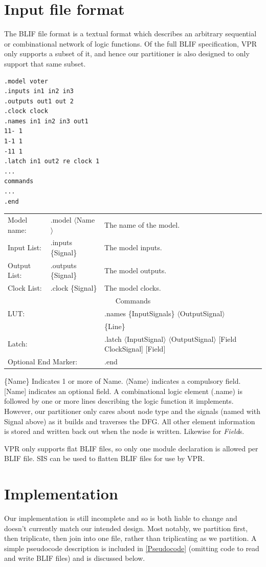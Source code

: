 \documentclass[12pt,final,oneside]{memoir} %
\begin{document}
\section{Input file format}\label{BLIFSection}
The \ac{BLIF} file format is a textual format which describes an arbitrary sequential or combinational network of logic functions\cite{BLIF}.
Of the full \ac{BLIF} specification, \ac{VPR} only supports a subset of it, and hence our partitioner is also designed to only support that same subset.
\begin{lstlisting}[caption=BLIF file layout, label=SampleBlif]
.model voter
.inputs in1 in2 in3
.outputs out1 out 2
.clock clock
.names in1 in2 in3 out1
11- 1
1-1 1
-11 1
.latch in1 out2 re clock 1
...
commands
...
.end
\end{lstlisting}
\begin{tabular}{lll}
    Model name: & .model $\langle$Name$\rangle$ & The name of the model.\\
    Input List: & .inputs \{Signal\} & The model inputs.\\
    Output List:& .outputs \{Signal\} & The model outputs.\\
    Clock List: & .clock \{Signal\} & The model clocks.\\
    \multicolumn{3}{c}{Commands}\\
    \multicolumn{2}{l}{\ac{LUT}:} & .names \{InputSignals\} $\langle$OutputSignal$\rangle$\\
     &&\{Line\}\\
    \multicolumn{2}{l}{Latch:} & .latch $\langle$InputSignal$\rangle$ $\langle$OutputSignal$\rangle$ [Field ClockSignal] [Field]\\
    \multicolumn{2}{l}{Optional End Marker:} & .end
\end{tabular}
\{Name\} Indicates 1 or more of Name. $\langle$Name$\rangle$ indicates a compulsory field. [Name] indicates an optional field.
A combinational logic element (.name) is followed by one or more lines describing the logic function it implements. However, our partitioner only cares about node type and the signals (named with Signal above) as it builds and traverses the \ac{DFG}. All other element information is stored and written back out when the node is written. Likewise for \emph{Field}s.

\ac{VPR} only supports flat \ac{BLIF} files, so only one module declaration is allowed per \ac{BLIF} file. \ac{SIS} can be used to flatten \ac{BLIF} files for use by \ac{VPR}.

\section{Implementation}
Our implementation is still incomplete and so is both liable to change and doesn't currently match our intended design. Most notably, we partition first, then triplicate, then join into one file, rather than triplicating as we partition. A simple pseudocode description is included in \ref{Pseudocode} (omitting code to read and write \ac{BLIF} files) and is discussed below.
\end{document}
